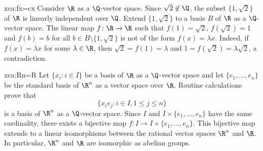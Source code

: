 \begin{sol}{xca:fx=cx}
    Consider $\R$ as a $\Q$-vector space. 
    Since $\sqrt{2}\not\in\Q$, the subset $\{1,\sqrt{2}\}$ of $\R$ 
    is linearly independent 
    over $\Q$. Extend $\{1,\sqrt{2}\}$ 
    to a basis $B$ of $\R$ as a $\Q$-vector space. The
    linear map $f\colon\R\to\R$ such that
    $f(1)=\sqrt{2}$, $f(\sqrt{2})=1$ and $f(b)=b$ for all $b\in B\setminus\{1,\sqrt{2}\}$ 
    is not of the form $f(x)=\lambda x$. Indeed, if $f(x)=\lambda x$ for some $\lambda\in\R$, 
    then $\sqrt{2}=f(1)=\lambda$ and $1=f(\sqrt{2})=\lambda\sqrt{2}$, a contradiction. 
\end{sol}

\begin{sol}{xca:Rn=R}
    Let $\{x_i:i\in I\}$ be a basis of $\R$ as a $\Q$-vector space and
    let $\{e_1,\dots,e_n\}$ be the standard basis of $\R^n$ as a vector space over $\R$. 
    Routine calculations prove that  
    \[
    \{x_ie_j:i\in I,1\leq j\leq n\}
    \]
    is a basis of $\R^n$ as a $\Q$-vector space. 
    Since
    $I$ and $I\times\{e_1,\dots,e_n\}$ have the same cardinality, 
    there exists a bijective map $f\colon I\to I\times\{e_1,\dots,e_n\}$. This bijective
    map extends to a linear isomorphisms between the rational vector spaces 
    $\R^n$ and
    $\R$. In particular, $\R^n$ and 
    $\R$ are isomorphic as abelian groups. 
\end{sol}










